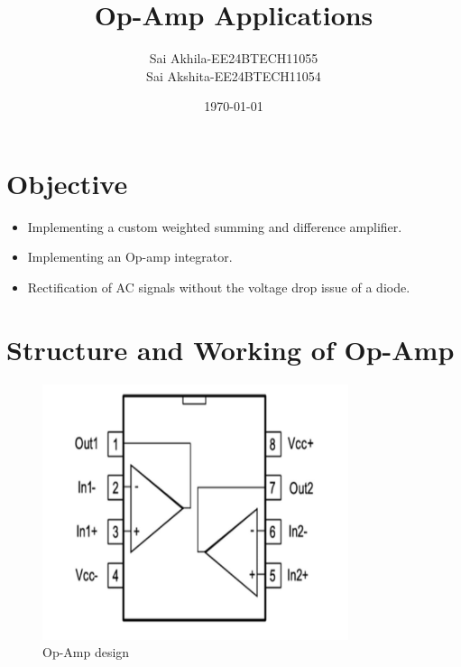 \documentclass[a4paper,12pt]{article}
\title{\textbf{Op-Amp Applications}}
\author{Sai Akhila-EE24BTECH11055 \\Sai Akshita-EE24BTECH11054}
\date{\today}
\begin{document}
\maketitle

\section{Objective}
\begin{itemize}
    \item Implementing a custom weighted summing and difference amplifier.
    \item Implementing an Op-amp integrator.
    \item Rectification of AC signals without the voltage drop issue of a diode.
\end{itemize}

\section{Structure and Working of Op-Amp}
\begin{figure}[H]
    \centering
    \includegraphics[width=0.8\textwidth]{fig/o.jpeg} %
    \caption{Op-Amp design}
    \label{fig:image_label}
\end{figure}
\end{document}
